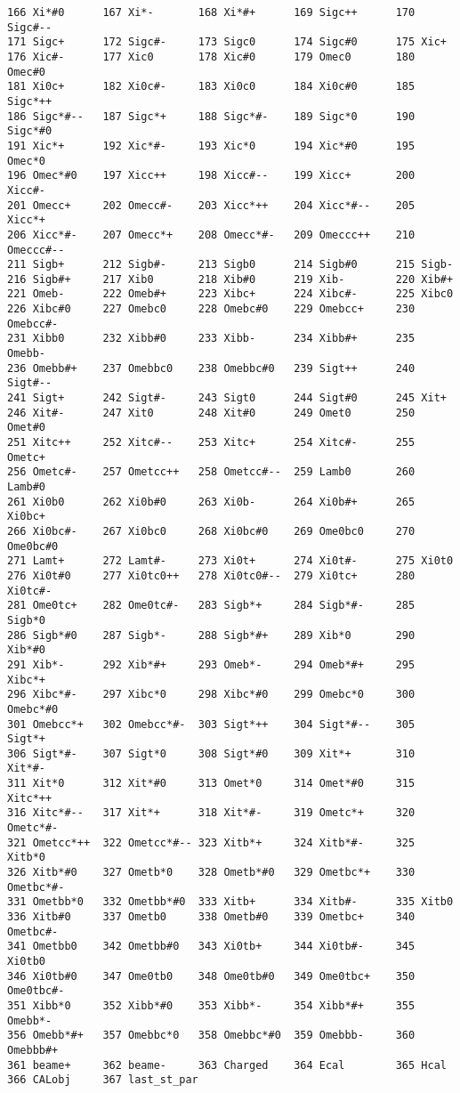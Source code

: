 \begin{verbatim}
166 Xi*#0      167 Xi*-       168 Xi*#+      169 Sigc++      170 Sigc#--
171 Sigc+      172 Sigc#-     173 Sigc0      174 Sigc#0      175 Xic+
176 Xic#-      177 Xic0       178 Xic#0      179 Omec0       180 Omec#0
181 Xi0c+      182 Xi0c#-     183 Xi0c0      184 Xi0c#0      185 Sigc*++
186 Sigc*#--   187 Sigc*+     188 Sigc*#-    189 Sigc*0      190 Sigc*#0
191 Xic*+      192 Xic*#-     193 Xic*0      194 Xic*#0      195 Omec*0
196 Omec*#0    197 Xicc++     198 Xicc#--    199 Xicc+       200 Xicc#-
201 Omecc+     202 Omecc#-    203 Xicc*++    204 Xicc*#--    205 Xicc*+
206 Xicc*#-    207 Omecc*+    208 Omecc*#-   209 Omeccc++    210 Omeccc#--
211 Sigb+      212 Sigb#-     213 Sigb0      214 Sigb#0      215 Sigb-
216 Sigb#+     217 Xib0       218 Xib#0      219 Xib-        220 Xib#+
221 Omeb-      222 Omeb#+     223 Xibc+      224 Xibc#-      225 Xibc0
226 Xibc#0     227 Omebc0     228 Omebc#0    229 Omebcc+     230 Omebcc#-
231 Xibb0      232 Xibb#0     233 Xibb-      234 Xibb#+      235 Omebb-
236 Omebb#+    237 Omebbc0    238 Omebbc#0   239 Sigt++      240 Sigt#--
241 Sigt+      242 Sigt#-     243 Sigt0      244 Sigt#0      245 Xit+
246 Xit#-      247 Xit0       248 Xit#0      249 Omet0       250 Omet#0
251 Xitc++     252 Xitc#--    253 Xitc+      254 Xitc#-      255 Ometc+
256 Ometc#-    257 Ometcc++   258 Ometcc#--  259 Lamb0       260 Lamb#0
261 Xi0b0      262 Xi0b#0     263 Xi0b-      264 Xi0b#+      265 Xi0bc+
266 Xi0bc#-    267 Xi0bc0     268 Xi0bc#0    269 Ome0bc0     270 Ome0bc#0
271 Lamt+      272 Lamt#-     273 Xi0t+      274 Xi0t#-      275 Xi0t0
276 Xi0t#0     277 Xi0tc0++   278 Xi0tc0#--  279 Xi0tc+      280 Xi0tc#-
281 Ome0tc+    282 Ome0tc#-   283 Sigb*+     284 Sigb*#-     285 Sigb*0
286 Sigb*#0    287 Sigb*-     288 Sigb*#+    289 Xib*0       290 Xib*#0
291 Xib*-      292 Xib*#+     293 Omeb*-     294 Omeb*#+     295 Xibc*+
296 Xibc*#-    297 Xibc*0     298 Xibc*#0    299 Omebc*0     300 Omebc*#0
301 Omebcc*+   302 Omebcc*#-  303 Sigt*++    304 Sigt*#--    305 Sigt*+
306 Sigt*#-    307 Sigt*0     308 Sigt*#0    309 Xit*+       310 Xit*#-
311 Xit*0      312 Xit*#0     313 Omet*0     314 Omet*#0     315 Xitc*++
316 Xitc*#--   317 Xit*+      318 Xit*#-     319 Ometc*+     320 Ometc*#-
321 Ometcc*++  322 Ometcc*#-- 323 Xitb*+     324 Xitb*#-     325 Xitb*0
326 Xitb*#0    327 Ometb*0    328 Ometb*#0   329 Ometbc*+    330 Ometbc*#-
331 Ometbb*0   332 Ometbb*#0  333 Xitb+      334 Xitb#-      335 Xitb0
336 Xitb#0     337 Ometb0     338 Ometb#0    339 Ometbc+     340 Ometbc#-
341 Ometbb0    342 Ometbb#0   343 Xi0tb+     344 Xi0tb#-     345 Xi0tb0
346 Xi0tb#0    347 Ome0tb0    348 Ome0tb#0   349 Ome0tbc+    350 Ome0tbc#-
351 Xibb*0     352 Xibb*#0    353 Xibb*-     354 Xibb*#+     355 Omebb*-
356 Omebb*#+   357 Omebbc*0   358 Omebbc*#0  359 Omebbb-     360 Omebbb#+
361 beame+     362 beame-     363 Charged    364 Ecal        365 Hcal
366 CALobj     367 last_st_par
\end{verbatim}
\newpage

